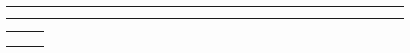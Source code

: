 \begin{titlepage}
{	\vspace{0.1in}
	\hrule
	\vspace{0.1in}
	
	\Huge \docTitle
	
	\vspace{0.05in}
	\hrule
	\vspace{0.4in}
	
	\large \teamnumber
	
	\vspace{0.1in}
}

\begin{minipage}[c]{\linewidth}
			\large
			\centering
			\begin{tabular}{l c c}
				\studentAname & \studentAmid & \studentAsid \\
				\studentBname & \studentBmid & \studentBsid \\
				\studentCname & \studentCmid & \studentCsid \\
			\end{tabular}
\end{minipage}


%		
%


\end{titlepage}